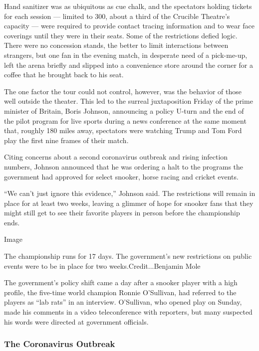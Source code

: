 Hand sanitizer was as ubiquitous as cue chalk, and the spectators
holding tickets for each session --- limited to 300, about a third of
the Crucible Theatre's capacity --- were required to provide contact
tracing information and to wear face coverings until they were in their
seats. Some of the restrictions defied logic. There were no concession
stands, the better to limit interactions between strangers, but one fan
in the evening match, in desperate need of a pick-me-up, left the arena
briefly and slipped into a convenience store around the corner for a
coffee that he brought back to his seat.

The one factor the tour could not control, however, was the behavior of
those well outside the theater. This led to the surreal juxtaposition
Friday of the prime minister of Britain, Boris Johnson, announcing a
policy U-turn and the end of the pilot program for live sports during a
news conference at the same moment that, roughly 180 miles away,
spectators were watching Trump and Tom Ford play the first nine frames
of their match.

Citing concerns about a second coronavirus outbreak and rising infection
numbers, Johnson announced that he was ordering a halt to the programs
the government had approved for select snooker, horse racing and cricket
events.

``We can't just ignore this evidence,'' Johnson said. The restrictions
will remain in place for at least two weeks, leaving a glimmer of hope
for snooker fans that they might still get to see their favorite players
in person before the championship ends.

Image

The championship runs for 17 days. The government's new restrictions on
public events were to be in place for two weeks.Credit...Benjamin Mole

The government's policy shift came a day after a snooker player with a
high profile, the five-time world champion Ronnie O'Sullivan, had
referred to the players as ``lab rats'' in an interview. O'Sullivan, who
opened play on Sunday, made his comments in a video teleconference with
reporters, but many suspected his words were directed at government
officials.

\hypertarget{the-coronavirus-outbreak}{%
\subsubsection{The Coronavirus
Outbreak}\label{the-coronavirus-outbreak}}

